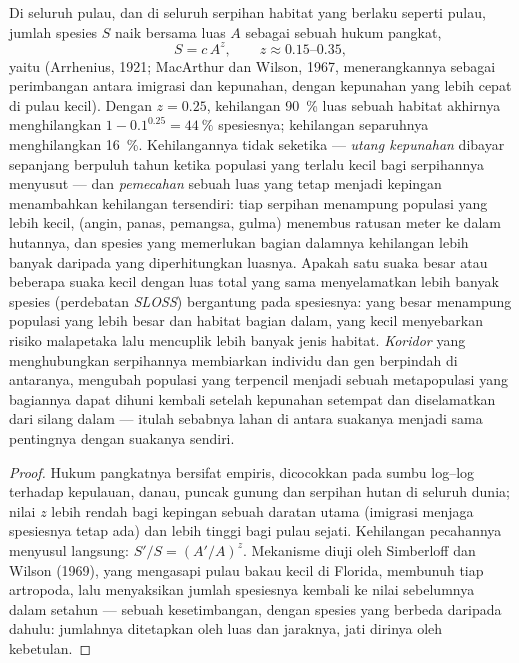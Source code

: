 \begin{proposition}\label{prop:b3:conservation-biology:area}
%
Di seluruh pulau, dan di seluruh serpihan habitat yang berlaku seperti
pulau, jumlah spesies $S$ naik bersama luas $A$ sebagai sebuah hukum pangkat,
\[
S = c\,A^{z}, \qquad z \approx 0.15\text{--}0.35,
\]
yaitu \emph{} (Arrhenius, 1921; 
MacArthur dan Wilson, 1967, menerangkannya sebagai perimbangan antara
imigrasi dan kepunahan, dengan kepunahan yang lebih cepat di pulau kecil).
Dengan $z = 0.25$, kehilangan \qty{90}{\%} luas sebuah habitat akhirnya
menghilangkan $1 - 0.1^{0.25} = \qty{44}{\%}$ spesiesnya; kehilangan
separuhnya menghilangkan \qty{16}{\%}. Kehilangannya tidak seketika ---
\emph{utang kepunahan} dibayar sepanjang berpuluh tahun ketika populasi
yang terlalu kecil bagi serpihannya menyusut --- dan \emph{pemecahan}
sebuah luas yang tetap menjadi kepingan menambahkan kehilangan tersendiri:
tiap serpihan menampung populasi yang lebih kecil, \emph{}
(angin, panas, pemangsa, gulma) menembus ratusan meter ke dalam hutannya,
dan spesies yang memerlukan bagian dalamnya kehilangan lebih banyak
daripada yang diperhitungkan luasnya. Apakah satu suaka besar atau
beberapa suaka kecil dengan luas total yang sama menyelamatkan lebih
banyak spesies (perdebatan \emph{SLOSS}) bergantung pada spesiesnya: yang
besar menampung populasi yang lebih besar dan habitat bagian dalam, yang
kecil menyebarkan risiko malapetaka lalu mencuplik lebih banyak jenis
habitat. \emph{Koridor} yang menghubungkan serpihannya membiarkan individu
dan gen berpindah di antaranya, mengubah populasi yang terpencil menjadi
sebuah metapopulasi yang bagiannya dapat dihuni kembali setelah kepunahan
setempat dan diselamatkan dari silang dalam --- itulah sebabnya lahan di
antara suakanya menjadi sama pentingnya dengan suakanya sendiri.
\end{proposition}
\begin{proof}
Hukum pangkatnya bersifat empiris, dicocokkan pada sumbu log--log
terhadap kepulauan, danau, puncak gunung dan serpihan hutan di seluruh
dunia; nilai $z$ lebih rendah bagi kepingan sebuah daratan utama (imigrasi
menjaga spesiesnya tetap ada) dan lebih tinggi bagi pulau sejati.
Kehilangan pecahannya menyusul langsung: $S'/S = (A'/A)^{z}$. Mekanisme
 diuji oleh Simberloff dan Wilson (1969), yang mengasapi
pulau bakau kecil di Florida, membunuh tiap artropoda, lalu menyaksikan
jumlah spesiesnya kembali ke nilai sebelumnya dalam setahun --- sebuah
kesetimbangan, dengan spesies yang berbeda daripada dahulu: jumlahnya
ditetapkan oleh luas dan jaraknya, jati dirinya oleh kebetulan.
\end{proof}


